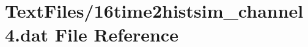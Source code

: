 \hypertarget{16time2histsim__channel4_8dat}{}\section{Text\+Files/16time2histsim\+\_\+channel4.dat File Reference}
\label{16time2histsim__channel4_8dat}
